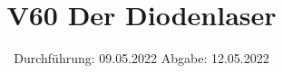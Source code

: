 

\subject{Fortgeschrittenenpraktikum}
\title{V60 Der Diodenlaser}
\date{%
  Durchführung: 09.05.2022
  \hspace{3em}
  Abgabe: 12.05.2022
}



\maketitle
\thispagestyle{empty}
\tableofcontents
\newpage






%

\printbibliography{}




